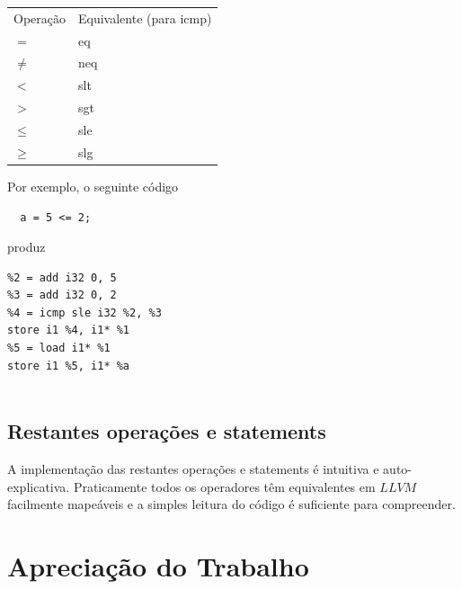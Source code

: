\documentclass[11pt,a4paper]{article}
\begin{document}
\pagebreak

\begin{table}
    \begin{tabular}{ll}
    Operação      & Equivalente (para icmp) \\
    $=$             & eq                      \\
    $\neq$ & neq                     \\
    $<$             & slt                     \\
    $>$             & sgt                     \\
    $\leq$ & sle                     \\
        $\geq$ & slg                     \\
    \end{tabular}
\end{table}

Por exemplo, o seguinte código

\begin{lstlisting}
  a = 5 <= 2;
\end{lstlisting}

produz

\begin{lstlisting}
%2 = add i32 0, 5
%3 = add i32 0, 2
%4 = icmp sle i32 %2, %3
store i1 %4, i1* %1
%5 = load i1* %1
store i1 %5, i1* %a
  
\end{lstlisting}

\subsection{Restantes operações e statements}

A implementação das restantes operações e statements é intuitiva e auto-explicativa. Praticamente todos os operadores têm equivalentes em $LLVM$ facilmente mapeáveis e a simples leitura do código é suficiente para compreender.

\pagebreak

\section{Apreciação do Trabalho}
\end{document}
